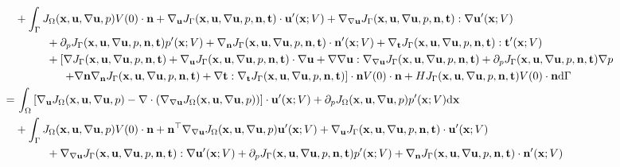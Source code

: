 \documentclass[oneside]{book}
\numberwithin{equation}{section}
\begin{document}
\begin{enumerate}[leftmargin=0in]
\begin{align*}
        &+ \int_\Gamma J_\Omega({\bf x},{\bf u},\nabla{\bf u},p)V(0)\cdot{\bf n} + \nabla_{\bf u}J_\Gamma({\bf x},{\bf u},\nabla{\bf u},p,{\bf n},{\bf t})\cdot{\bf u}'({\bf x};V) + \nabla_{\nabla{\bf u}}J_\Gamma({\bf x},{\bf u},\nabla{\bf u},p,{\bf n},{\bf t}):\nabla{\bf u}'({\bf x};V)\\
        &\hspace{1cm}+ \partial_pJ_\Gamma({\bf x},{\bf u},\nabla{\bf u},p,{\bf n},{\bf t})p'({\bf x};V) + \nabla_{\bf n}J_\Gamma({\bf x},{\bf u},\nabla{\bf u},p,{\bf n},{\bf t})\cdot{\bf n}'({\bf x};V) + \nabla_{\bf t}J_\Gamma({\bf x},{\bf u},\nabla{\bf u},p,{\bf n},{\bf t}):{\bf t}'({\bf x};V)\\
        &\hspace{1cm}+ \left[\nabla J_\Gamma({\bf x},{\bf u},\nabla{\bf u},p,{\bf n},{\bf t}) + \nabla_{\bf u}J_\Gamma({\bf x},{\bf u},\nabla{\bf u},p,{\bf n},{\bf t})\cdot\nabla{\bf u} + \nabla\nabla{\bf u}:\nabla_{\nabla{\bf u}}J_\Gamma({\bf x},{\bf u},\nabla{\bf u},p,{\bf n},{\bf t}) + \partial_pJ_\Gamma({\bf x},{\bf u},\nabla{\bf u},p,{\bf n},{\bf t})\nabla p\right.\\
        &\hspace{15mm} \left.+ \nabla{\bf n}\nabla_{\bf n}J_\Gamma({\bf x},{\bf u},\nabla{\bf u},p,{\bf n},{\bf t}) + \nabla{\bf t}:\nabla_{\bf t}J_\Gamma({\bf x},{\bf u},\nabla{\bf u},p,{\bf n},{\bf t})\right]\cdot{\bf n}V(0)\cdot{\bf n} + HJ_\Gamma({\bf x},{\bf u},\nabla{\bf u},p,{\bf n},{\bf t})V(0)\cdot{\bf n}{\rm d}\Gamma\\
        =&\, \int_\Omega \left[\nabla_{\bf u}J_\Omega({\bf x},{\bf u},\nabla{\bf u},p) - \nabla\cdot(\nabla_{\nabla{\bf u}}J_\Omega({\bf x},{\bf u},\nabla{\bf u},p))\right]\cdot{\bf u}'({\bf x};V) + \partial_pJ_\Omega({\bf x},{\bf u},\nabla{\bf u},p)p'({\bf x};V){\rm d}{\bf x}\\
        &+ \int_\Gamma J_\Omega({\bf x},{\bf u},\nabla{\bf u},p)V(0)\cdot{\bf n} + {\bf n}^\top\nabla_{\nabla{\bf u}}J_\Omega({\bf x},{\bf u},\nabla{\bf u},p){\bf u}'({\bf x};V) + \nabla_{\bf u}J_\Gamma({\bf x},{\bf u},\nabla{\bf u},p,{\bf n},{\bf t})\cdot{\bf u}'({\bf x};V)\\
        &\hspace{1cm}+ \nabla_{\nabla{\bf u}}J_\Gamma({\bf x},{\bf u},\nabla{\bf u},p,{\bf n},{\bf t}):\nabla{\bf u}'({\bf x};V) + \partial_pJ_\Gamma({\bf x},{\bf u},\nabla{\bf u},p,{\bf n},{\bf t})p'({\bf x};V) + \nabla_{\bf n}J_\Gamma({\bf x},{\bf u},\nabla{\bf u},p,{\bf n},{\bf t})\cdot{\bf n}'({\bf x};V)\\

\end{align*}
\end{enumerate}
\end{document}

